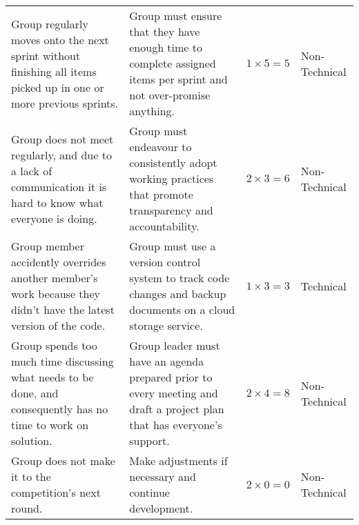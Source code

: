 \begin{table}
\begin{tabular*}{14.0cm}{p{4.0cm}p{5.0cm}p{1.5cm}p{2cm}}
    \addlinespace[0.5em]
    Group regularly moves onto the next sprint without finishing all items picked up in one or more previous sprints. & Group must ensure that they have enough time to complete assigned items per sprint and not over-promise anything. & $1 \times 5 = 5$ & Non-Technical \\
    \addlinespace[0.5em]
    Group does not meet regularly, and due to a lack of communication it is hard to know what everyone is doing. & Group must endeavour to consistently adopt working practices that promote transparency and accountability. & $2 \times 3 = 6$ & Non-Technical \\
    \addlinespace[0.5em]
    Group member accidently overrides another member’s work because they didn’t have the latest version of the code. & Group must use a version control system to track code changes and backup documents on a cloud storage service. & $1 \times 3 = 3$ & Technical \\
    \addlinespace[0.5em]
    Group spends too much time discussing what needs to be done, and consequently has no time to work on solution. & Group leader must have an agenda prepared prior to every meeting and draft a project plan that has everyone’s support. & $2 \times 4 = 8$ & Non-Technical \\
    \addlinespace[0.5em]
    Group does not make it to the competition’s next round. & Make adjustments if necessary and continue development. & $2 \times 0 = 0$ & Non-Technical \\
    \bottomrule
  \end{tabular*}
\end{table}
